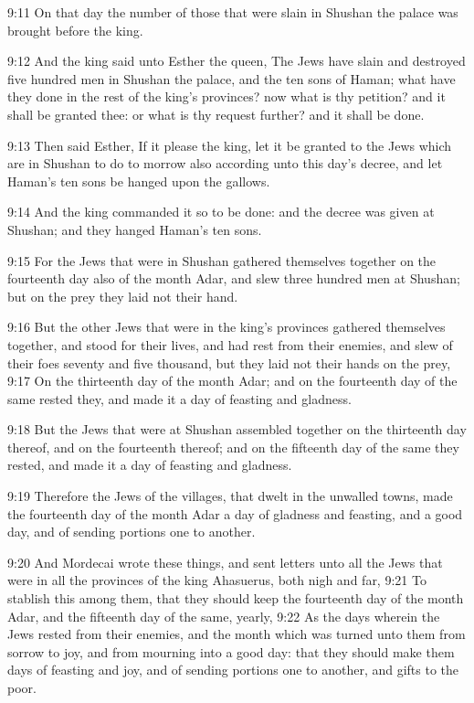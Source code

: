 9:11 On that day the number of those that were slain in Shushan the
palace was brought before the king.

9:12 And the king said unto Esther the queen, The Jews have slain and
destroyed five hundred men in Shushan the palace, and the ten sons of
Haman; what have they done in the rest of the king's provinces? now
what is thy petition? and it shall be granted thee: or what is thy
request further? and it shall be done.

9:13 Then said Esther, If it please the king, let it be granted to the
Jews which are in Shushan to do to morrow also according unto this
day's decree, and let Haman's ten sons be hanged upon the gallows.

9:14 And the king commanded it so to be done: and the decree was given
at Shushan; and they hanged Haman's ten sons.

9:15 For the Jews that were in Shushan gathered themselves together on
the fourteenth day also of the month Adar, and slew three hundred men
at Shushan; but on the prey they laid not their hand.

9:16 But the other Jews that were in the king's provinces gathered
themselves together, and stood for their lives, and had rest from
their enemies, and slew of their foes seventy and five thousand, but
they laid not their hands on the prey, 9:17 On the thirteenth day of
the month Adar; and on the fourteenth day of the same rested they, and
made it a day of feasting and gladness.

9:18 But the Jews that were at Shushan assembled together on the
thirteenth day thereof, and on the fourteenth thereof; and on the
fifteenth day of the same they rested, and made it a day of feasting
and gladness.

9:19 Therefore the Jews of the villages, that dwelt in the unwalled
towns, made the fourteenth day of the month Adar a day of gladness and
feasting, and a good day, and of sending portions one to another.

9:20 And Mordecai wrote these things, and sent letters unto all the
Jews that were in all the provinces of the king Ahasuerus, both nigh
and far, 9:21 To stablish this among them, that they should keep the
fourteenth day of the month Adar, and the fifteenth day of the same,
yearly, 9:22 As the days wherein the Jews rested from their enemies,
and the month which was turned unto them from sorrow to joy, and from
mourning into a good day: that they should make them days of feasting
and joy, and of sending portions one to another, and gifts to the
poor.

